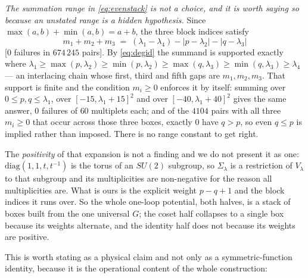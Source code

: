 \documentclass[11pt,a4paper]{article}
\newcommand{\Sig}{\Sigma_\lambda}
\begin{document}
\emph{The summation range in \eqref{eq:evenstack} is not a choice, and it is worth saying so because
an unstated range is a hidden hypothesis.} Since $\max(a,b)+\min(a,b)=a+b$, the three block indices
satisfy
\begin{equation}\label{eq:degid}
m_1+m_2+m_3 \;=\; (\lambda_1-\lambda_4)-|p-\lambda_2|-|q-\lambda_3|
\end{equation}
[$0$ failures in $674\,245$ pairs]. By \eqref{eq:degid} the summand is supported exactly where
$\lambda_1\ge\max(p,\lambda_2)\ge\min(p,\lambda_2)\ge\max(q,\lambda_3)\ge\min(q,\lambda_3)\ge\lambda_4$
--- an interlacing chain whose first, third and fifth gaps are $m_1,m_2,m_3$. That support is finite
and the condition $m_i\ge0$ enforces it by itself: summing over $0\le p,q\le\lambda_1$, over
$[-15,\lambda_1{+}15]^2$ and over $[-40,\lambda_1{+}40]^2$ gives the same answer, $0$ failures of
$60$ multiplets each; and of the $4104$ pairs with all three $m_i\ge0$ that occur across those three
boxes, exactly $0$ have $q>p$, so even $q\le p$ is implied rather than imposed. There is no range
constant to get right.

The \emph{positivity} of that expansion is not a finding and we do not
present it as one: $\mathrm{diag}(1,1,t,t^{-1})$ is the torus of an $SU(2)$ subgroup, so
$\Sig$ is a restriction of $V_\lambda$ to that subgroup and its multiplicities are non-negative for
the reason all multiplicities are. What is ours is the explicit weight $p-q+1$ and the block indices
it runs over. So the whole one-loop potential, both halves, is a stack of boxes built
from the one universal $G$; the coset half collapses to a single box because its weights alternate,
and the identity half does not because its weights are positive.

This is worth stating as a physical claim and not only as a symmetric-function identity, because it
is the operational content of the whole construction:

\begin{center}
\end{center}
\end{document}

